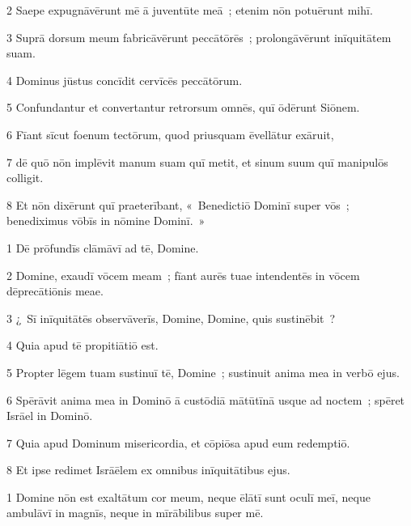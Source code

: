 \psalmVerse
  {\phantom{00}2}
  {Saepe expugnāvērunt mē ā juventūte meā~; etenim nōn potuērunt mihī.}


\psalmVerse
  {\phantom{00}3}
  {Suprā dorsum meum fabricāvērunt peccātōrēs~; prolongāvērunt inīquitātem suam.}


\psalmVerse
  {\phantom{00}4}
  {Dominus jūstus concīdit cervīcēs peccātōrum.}


\psalmVerse
  {\phantom{00}5}
  {Confundantur et convertantur retrorsum omnēs, quī ōdērunt Siōnem.}


\psalmVerse
  {\phantom{00}6}
  {Fīant sīcut foenum tectōrum, quod priusquam ēvellātur exāruit,}


\psalmVerse
  {\phantom{00}7}
  {dē quō nōn implēvit manum suam quī metit, et sinum suum quī manipulōs colligit.}


\psalmVerse
  {\phantom{00}8}
  {Et nōn dixērunt quī praeterībant, «~Benedictiō Dominī super vōs~; benediximus vōbīs in nōmine Dominī.~»}




\psalmVerse
  {\phantom{00}1}
  {Dē prōfundīs clāmāvī ad tē, Domine.}


\psalmVerse
  {\phantom{00}2}
  {Domine, exaudī vōcem meam~; fīant aurēs tuae intendentēs in vōcem dēprecātiōnis meae.}


\psalmVerse
  {\phantom{00}3}
  {¿~Sī inīquitātēs observāverīs, Domine, Domine, quis sustinēbit~?}


\psalmVerse
  {\phantom{00}4}
  {Quia apud tē propitiātiō est.}


\psalmVerse
  {\phantom{00}5}
  {Propter lēgem tuam sustinuī tē, Domine~; sustinuit anima mea in verbō ejus.}


\psalmVerse
  {\phantom{00}6}
  {Spērāvit anima mea in Dominō ā custōdiā mātūtīnā usque ad noctem~; spēret Isrāel in Dominō.}


\psalmVerse
  {\phantom{00}7}
  {Quia apud Dominum misericordia, et cōpiōsa apud eum redemptiō.}


\psalmVerse
  {\phantom{00}8}
  {Et ipse redimet Isrāēlem ex omnibus inīquitātibus ejus.}



\psalmVerse
  {\phantom{00}1}
  {Domine nōn est exaltātum cor meum, neque ēlātī sunt oculī meī, neque ambulāvī in magnīs, neque in mīrābilibus super mē.}


